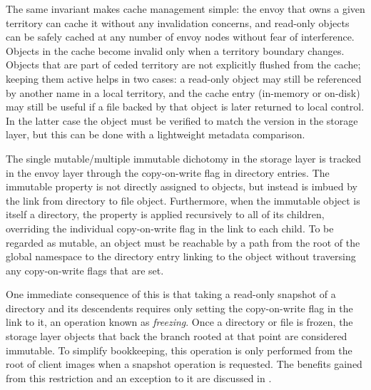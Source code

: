 The same invariant makes cache management simple: the envoy that owns a given territory can cache it without any invalidation concerns, and read-only objects can be safely cached at any number of envoy nodes without fear of interference. Objects in the cache become invalid only when a territory boundary changes. Objects that are part of ceded territory are not explicitly flushed from the cache; keeping them active helps in two cases: a read-only object may still be referenced by another name in a local territory, and the cache entry (in-memory or on-disk) may still be useful if a file backed by that object is later returned to local control. In the latter case the object must be verified to match the version in the storage layer, but this can be done with a lightweight metadata comparison.

The single mutable/multiple immutable dichotomy in the storage layer is tracked in the envoy layer through the copy-on-write flag in directory entries. The immutable property is not directly assigned to objects, but instead is imbued by the link from directory to file object. Furthermore, when the immutable object is itself a directory, the property is applied recursively to all of its children, overriding the individual copy-on-write flag in the link to each child. To be regarded as mutable, an object must be reachable by a path from the root of the global namespace to the directory entry linking to the object without traversing any copy-on-write flags that are set.

One immediate consequence of this is that taking a read-only snapshot of a directory and its descendents requires only setting the copy-on-write flag in the link to it, an operation known as \emph{freezing}. Once a directory or file is frozen, the storage layer objects that back the branch rooted at that point are considered immutable. To simplify bookkeeping, this operation is only performed from the root of client images when a snapshot operation is requested. The benefits gained from this restriction and an exception to it are discussed in .

